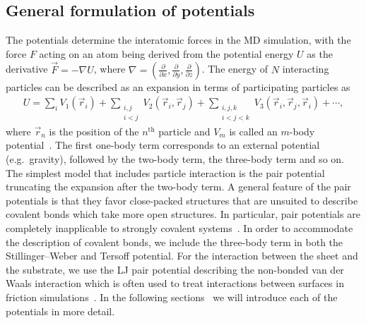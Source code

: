 \subsection{General formulation of potentials}
The potentials determine the interatomic forces in the \acrshort{MD} simulation, with the force $F$ acting on an atom being derived from the potential energy $U$ as the derivative $\vec{F} = -\nabla U$, where $\nabla = (\frac{\partial}{\partial x}, \frac{\partial}{\partial y}, \frac{\partial}{\partial z})$. The energy of $N$ interacting particles can be described as an expansion in terms of participating particles as 
\begin{align*}
  U = \sum_i V_1(\vec{r}_i) + 
      \sum_{\substack{i, j \\ i < j}} V_2(\vec{r}_i, \vec{r}_j) +  
      \sum_{\substack{i,j,k \\ i < j < k}} V_3(\vec{r}_i, \vec{r}_j, \vec{r}_i) + \cdots,
\end{align*} 
where $\vec{r}_n$ is the position of the $n^{\text{th}}$ particle and $V_m$ is called an $m$-body potential~\cite{PhysRevB.37.6991}. The first one-body term corresponds
to an external potential (e.g.\ gravity), followed by the two-body term, the
three-body term and so on. The simplest model that includes particle interaction
is the pair potential truncating the expansion after the two-body term. A general feature of the pair potentials is that they favor close-packed
structures that are unsuited to describe covalent bonds which take more open
structures. In particular, pair potentials are completely inapplicable to
strongly covalent systems~\cite{PhysRevB.37.6991}. In order to accommodate the
description of covalent bonds, we include the three-body term in both the Stillinger–Weber and Tersoff potential. For the interaction between the sheet and the substrate, we use the \acrshort{LJ} pair potential describing the non-bonded van der Waals interaction which is often used to treat interactions between surfaces in friction simulations~\cite{zhu_study_2018,ZHANG201585,Yoon2015MolecularDS,kim_nano-scale_2009}. In the following sections~ we will introduce each of the potentials in more detail.


